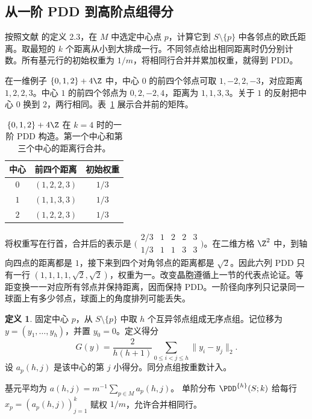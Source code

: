 \documentclass[11pt,a4paper,UTF8,fontset=fandol]{ctexart}
\theoremstyle{definition}
\newtheorem{definition}{定义}
\begin{document}
\subsection{从一阶 PDD 到高阶点组得分}

按照文献 \cite{wkhigher} 的定义 2.3，在 \(M\) 中选定中心点 \(p\)，计算它到 \(S\setminus\{p\}\) 中各邻点的欧氏距离。取最短的 \(k\) 个距离从小到大排成一行。不同邻点给出相同距离时仍分别计数。所有基元行的初始权重为 \(1/m\)，将相同行合并并累加权重，就得到 PDD。

在一维例子 \(\{0,1,2\}+4\Z\) 中，中心 \(0\) 的前四个邻点可取 \(1,-2,2,-3\)，对应距离 \(1,2,2,3\)。中心 \(1\) 的前四个邻点为 \(0,2,-2,4\)，距离为 \(1,1,3,3\)。关于 \(1\) 的反射把中心 \(0\) 换到 \(2\)，两行相同。表~\ref{tab:pdd} 展示合并前的矩阵。

\begin{table}[htbp]
\centering
\caption{\(\{0,1,2\}+4\Z\) 在 \(k=4\) 时的一阶 PDD 构造。第一个中心和第三个中心的距离行合并。}\label{tab:pdd}
\begin{tabular}{ccc}
\toprule
中心 & 前四个距离 & 初始权重\\
\midrule
\(0\) & \((1,2,2,3)\) & \(1/3\)\\
\(1\) & \((1,1,3,3)\) & \(1/3\)\\
\(2\) & \((1,2,2,3)\) & \(1/3\)\\
\bottomrule
\end{tabular}
\end{table}

将权重写在行首，合并后的表示是 \(\bigl(\begin{smallmatrix}2/3&1&2&2&3\\1/3&1&1&3&3\end{smallmatrix}\bigr)\)。在二维方格 \(\Z^2\) 中，到轴向四点的距离都是 \(1\)，接下来到四个对角邻点的距离都是 \(\sqrt2\)。因此六列 PDD 只有一行 \((1,1,1,1,\sqrt2,\sqrt2)\)，权重为一。改变晶胞遵循上一节的代表点论证。等距变换一一对应所有邻点并保持距离，因而保持 PDD。一阶径向序列只记录同一球面上有多少邻点，球面上的角度排列可能丢失。

\begin{definition}\label{def:score}
固定中心 \(p\)，从 \(S\setminus\{p\}\) 中取 \(h\) 个互异邻点组成无序点组。记位移为 \(y=(y_1,\ldots,y_h)\)，并置 \(y_0=0\)。定义得分
\begin{equation}\label{eq:score}
G(y)=\frac{2}{h(h+1)}\sum_{0\le i<j\le h}\|y_i-y_j\|_2 .
\end{equation}
设 \(a_p(h,j)\) 是该中心的第 \(j\) 小得分。同分点组按重数计入。

基元平均为
\(a(h,j)=m^{-1}\sum_{p\in M}a_p(h,j)\)。
单阶分布 \(\PDD^{\{h\}}(S;k)\) 给每行 \(x_p=(a_p(h,j))_{j=1}^k\) 赋权 \(1/m\)，允许合并相同行。
\end{definition}
\end{document}
